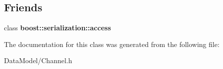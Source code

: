 \subsection*{Friends}
\begin{DoxyCompactItemize}
\item 
\hypertarget{classChannel_ac98d07dd8f7b70e16ccb9a01abf56b9c}{class {\bfseries boost\-::serialization\-::access}}\label{classChannel_ac98d07dd8f7b70e16ccb9a01abf56b9c}

\end{DoxyCompactItemize}


The documentation for this class was generated from the following file\-:\begin{DoxyCompactItemize}
\item 
Data\-Model/Channel.\-h\end{DoxyCompactItemize}
